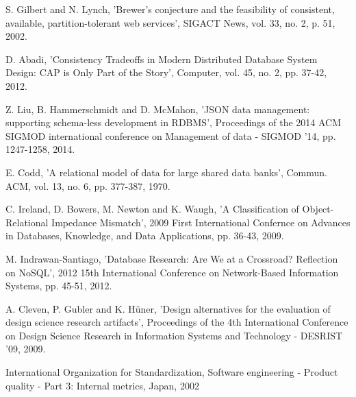 \begin{thebibliography}{69}



 S.  Gilbert and N.  Lynch, 'Brewer's conjecture and the feasibility of consistent, available, partition-tolerant web services', SIGACT News, vol. 33, no. 2, p. 51, 2002.

 D.  Abadi, 'Consistency Tradeoffs in Modern Distributed Database System Design: CAP is Only Part of the Story', Computer, vol. 45, no. 2, pp. 37-42, 2012.

Z.  Liu, B.  Hammerschmidt and D.  McMahon, 'JSON data management: supporting schema-less development in RDBMS', Proceedings of the 2014 ACM SIGMOD international conference on Management of data - SIGMOD '14, pp. 1247-1258, 2014.

 E.  Codd, 'A relational model of data for large shared data banks', Commun. ACM, vol. 13, no. 6, pp. 377-387, 1970.

 C.  Ireland, D.  Bowers, M.  Newton and K.  Waugh, 'A Classification of Object-Relational Impedance Mismatch', 2009 First International Confernce on Advances in Databases, Knowledge, and Data Applications, pp. 36-43, 2009.

 M.  Indrawan-Santiago, 'Database Research: Are We at a Crossroad? Reflection on NoSQL', 2012 15th International Conference on Network-Based Information Systems, pp. 45-51, 2012.

 A.  Cleven, P.  Gubler and K.  Hüner, 'Design alternatives for the evaluation of design science research artifacts', Proceedings of the 4th International Conference on Design Science Research in Information Systems and Technology - DESRIST '09, 2009.

 International Organization for Standardization, Software engineering - Product quality - Part 3: Internal metrics, Japan, 2002


\end{thebibliography}
